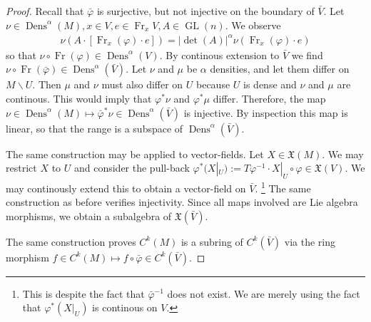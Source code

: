 \documentclass[letterpaper, 10 pt, conference]{ieeeconf}
\DeclareMathOperator{\Fr}{Fr}
\DeclareMathOperator{\GL}{GL}
\DeclareMathOperator{\Dens}{Dens}
\begin{document}
  \begin{proof}
    Recall that $\bar{\varphi}$ is surjective, but not injective
    on the boundary of $\bar{V}$.
    Let $\nu \in \Dens^\alpha(M), x \in V, e \in \Fr_x V, A \in \GL(n)$.
    We observe
    \begin{align*}
      \nu( A \cdot [ \Fr_x(\varphi) \cdot e ] ) =
      | \det(A) |^{\alpha} \nu( \Fr_x(\varphi) \cdot e)
    \end{align*}
    so that $\nu \circ \Fr(\varphi) \in \Dens^\alpha(V)$.
    By continous extension to $\bar{V}$ we find
    $\nu \circ \Fr(\bar{\varphi}) \in \Dens^\alpha(\bar{V})$.
    Let $\nu$ and $\mu$ be $\alpha$ densities,
    and let them differ on $M\backslash U$.
    Then $\mu$ and $\nu$ must also differ on $U$ 
    because $U$ is dense and $\nu$ and $\mu$ are continous.
    This would imply that $\varphi^*\nu$ and $\varphi^*\mu$ differ.
    Therefore, the map
    $\nu \in \Dens^\alpha(M) \mapsto \bar{\varphi}^*\nu \in \Dens^\alpha(\bar{V})$ is injective.
    By inspection this map is linear, so that the range is
    a subspace of $\Dens^\alpha(\bar{V})$.

    The same construction may be applied to vector-fields.
    Let $X \in \mathfrak{X}(M)$.
    We may restrict $X$ to $U$ and consider the pull-back
    $\varphi^*(X|_U) := T\varphi^{-1} \cdot X|_U \circ \varphi \in \mathfrak{X}(V)$.
    We may continously extend this to obtain a vector-field on $\bar{V}$.
    \footnote{This is despite the fact that $\bar{\varphi}^{-1}$
      does not exist.  We are merely using the fact that
    $\varphi^*(X|_U)$ is continous on $V$.}
    The same construction as before verifies injectivity.
    Since all maps involved are Lie algebra morphisms, we obtain
    a subalgebra of $\mathfrak{X}(\bar{V})$.

    The same construction proves $C^k(M)$ is a subring of $C^k(\bar{V})$
    via the ring morphism
    $f \in C^k(M) \mapsto f \circ \bar{\varphi} \in C^k(\bar{V})$.
  \end{proof}
\end{document}
